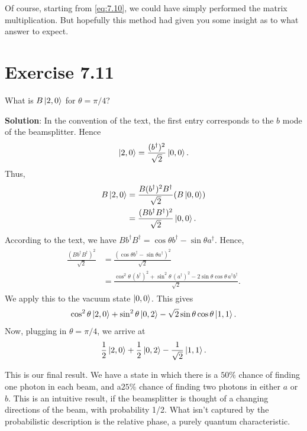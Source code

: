 \documentclass{book}
\begin{document}
    Of course, starting from \eqref{eq:7.10}, we could have simply performed the matrix multiplication. But hopefully this method had given you some insight as to what answer to expect. 

\section*{Exercise 7.11}
    What is $B\ket{2,0}$ for $\theta = \pi/4$?

    \textbf{Solution}: In the convention of the text, the first entry corresponds to the $b$ mode of the beamsplitter. Hence
    \begin{align}
        \ket{2,0} = \frac{(b^\dagger)^2}{\sqrt{2}} \ket{0,0}.
    \end{align}
    Thus,
    \begin{align}
    \begin{aligned}
        B\ket{2,0} &= \frac{B (b^\dagger)^2 B^
        \dagger}{\sqrt{2}} (B \ket{0,0}) \\
        &= \frac{(B b^\dagger B^\dagger)^2}{\sqrt{2}} \ket{0,0}.
    \end{aligned}
    \end{align}
    According to the text, we have $B b^\dagger B^\dagger = \cos \theta b^\dagger - \sin\theta a^\dagger$. Hence,
    \begin{align}
    \begin{aligned}
        \frac{(Bb^\dagger B^\dagger)^2}{\sqrt{2}} &= \frac{(\cos \theta b^\dagger - \sin\theta a^\dagger)^2}{\sqrt{2}} \\
        &= \frac{\cos^2 \theta\, (b^\dagger)^2 + \sin^2 \theta\,(a^\dagger)^2 - 2 \sin\theta \cos\theta\, a^\dagger b^\dagger}{\sqrt{2}}.
    \end{aligned}
    \end{align}
    We apply this to the vacuum state $\ket{0,0}$. This gives
    \begin{align}
        \cos^2 \theta \ket{2,0} + \sin^2 \theta \ket{0,2} - \sqrt{2} \sin\theta \cos\theta \ket{1,1}.
    \end{align}
    Now, plugging in $\theta = \pi/4$, we arrive at 
    \begin{align}
        \frac{1}{2}\ket{2,0} + \frac{1}{2} \ket{0,2} - \frac{1}{\sqrt{2}} \ket{1,1}.
    \end{align}
    
    This is our final result. We have a state in which there is a $50\%$ chance of finding one photon in each beam, and a$25\%$ chance of finding two photons in either $a$ or $b$. This is an intuitive result, if the beamsplitter is thought of a changing directions of the beam, with probability 1/2. What isn't captured by the probabilistic description is the relative phase, a purely quantum characteristic.
\end{document}
